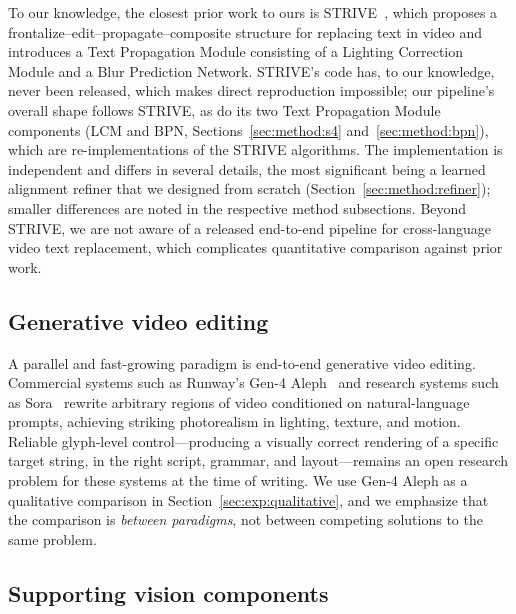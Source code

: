 To our knowledge, the closest prior work to ours is
STRIVE~\citep{subramanian2021strive}, which proposes a
frontalize--edit--propagate--composite structure for replacing text
in video and introduces a Text Propagation Module consisting of a
Lighting Correction Module and a Blur Prediction Network. STRIVE's
code has, to our knowledge, never been released, which makes direct
reproduction impossible; our pipeline's overall shape follows
STRIVE, as do its two Text Propagation Module components (LCM and
BPN, Sections~\ref{sec:method:s4} and~\ref{sec:method:bpn}), which
are re-implementations of the STRIVE algorithms. The implementation
is independent and differs in several details, the most significant
being a learned alignment refiner that we designed from scratch
(Section~\ref{sec:method:refiner}); smaller differences are noted
in the respective method subsections.
Beyond STRIVE, we are not aware of a released end-to-end pipeline
for cross-language video text replacement, which complicates
quantitative comparison against prior work.

\subsection{Generative video editing}
\label{sec:related:generative}

A parallel and fast-growing paradigm is end-to-end generative video
editing. Commercial systems such as Runway's Gen-4
Aleph~\citep{runway2025aleph} and research systems such as
Sora~\citep{openai2024sora} rewrite arbitrary regions of video
conditioned on natural-language prompts, achieving striking
photorealism in lighting, texture, and motion. Reliable glyph-level
control---producing a visually correct rendering of a specific
target string, in the right script, grammar, and layout---remains an
open research problem for these systems at the time of writing. We
use Gen-4 Aleph as a qualitative comparison in
Section~\ref{sec:exp:qualitative}, and we emphasize that the
comparison is \emph{between paradigms}, not between competing
solutions to the same problem.

\subsection{Supporting vision components}
\label{sec:related:support}

